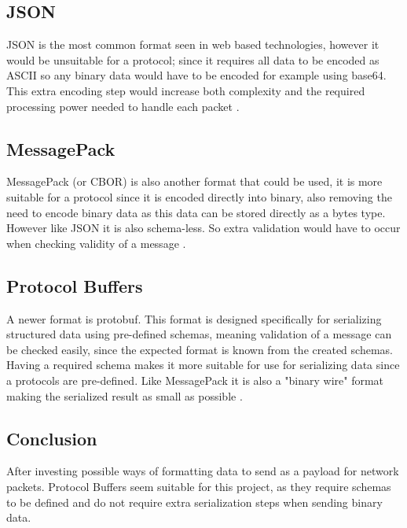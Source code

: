 \subsection*{JSON}
JSON is the most common format seen in web based technologies, however it would be unsuitable for a protocol; since it requires all data to be encoded as ASCII so any binary data would have to be encoded for example using base64. This extra encoding step would increase both complexity and the required processing power needed to handle each packet \parencite{json-rfc8259}.

\subsection*{MessagePack}
MessagePack (or CBOR) is also another format that could be used, it is more suitable for a protocol since it is encoded directly into binary, also removing the need to encode binary data as this data can be stored directly as a bytes type. However like JSON it is also schema-less. So extra validation would have to occur when checking validity of a message \parencite{msgpack} \parencite{cbor-rfc8949}.

\subsection*{Protocol Buffers}
A newer format is protobuf. This format is designed specifically for serializing structured data using pre-defined schemas, meaning validation of a message can be checked easily, since the expected format is known from the created schemas. Having a required schema makes it more suitable for use for serializing data since a protocols are pre-defined. Like MessagePack it is also a "binary wire" format making the serialized result as small as possible \parencite{protobuf-3}.

\subsection*{Conclusion}
After investing possible ways of formatting data to send as a payload for network packets. Protocol Buffers seem suitable for this project, as they require schemas to be defined and do not require extra serialization steps when sending binary data.
